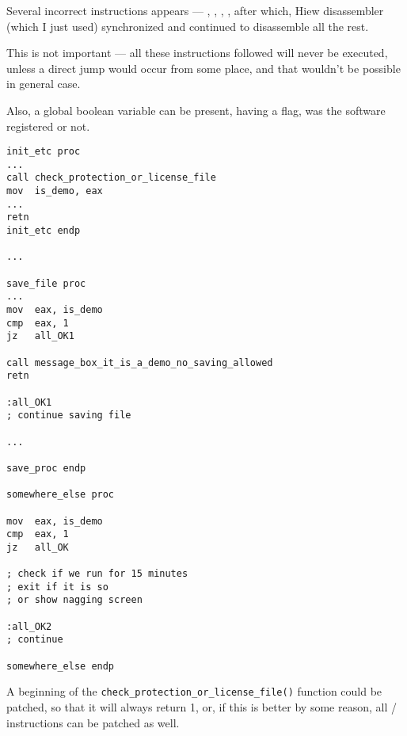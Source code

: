 Several incorrect instructions appears --- , , , ,
after which, Hiew disassembler (which I just used) synchronized and continued to disassemble all the rest.

This is not important --- all these instructions followed  will never be executed,
unless a direct jump would occur from some place, and that wouldn't be possible in general case.

\myhrule{}

Also, a global boolean variable can be present, having a flag, was the software registered or not.

\begin{lstlisting}[style=customasmx86]
init_etc proc
...
call check_protection_or_license_file
mov  is_demo, eax
...
retn
init_etc endp

...

save_file proc
...
mov  eax, is_demo
cmp  eax, 1
jz   all_OK1

call message_box_it_is_a_demo_no_saving_allowed
retn

:all_OK1
; continue saving file

...

save_proc endp

somewhere_else proc

mov  eax, is_demo
cmp  eax, 1
jz   all_OK

; check if we run for 15 minutes
; exit if it is so
; or show nagging screen

:all_OK2
; continue

somewhere_else endp
\end{lstlisting}

A beginning of the \verb|check_protection_or_license_file()| function could be patched, so that it will always return 1,
or, if this is better by some reason, all / instructions can be patched as well.


